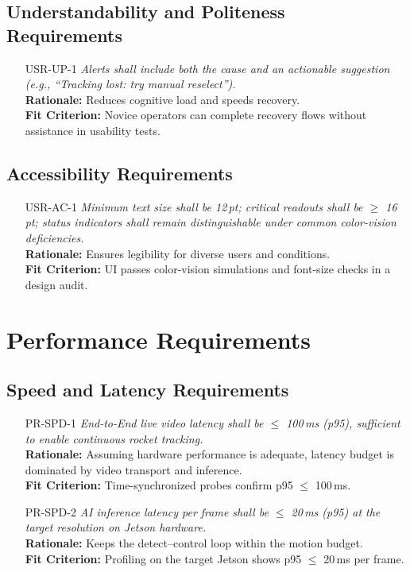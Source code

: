 \documentclass[12pt]{article}
\begin{document}
\subsection{Understandability and Politeness Requirements}
\begin{itemize}[leftmargin=*]
  \item[USR-UP-1] \emph{Alerts shall include both the cause and an actionable
          suggestion (e.g., ``Tracking lost: try manual reselect'').}\\
        \textbf{Rationale:} Reduces cognitive load and speeds recovery.\\ \textbf{Fit
          Criterion:} Novice operators can complete recovery flows without assistance in
        usability tests.
\end{itemize}

\subsection{Accessibility Requirements}
\begin{itemize}[leftmargin=*]
  \item[USR-AC-1] \emph{Minimum text size shall be 12\,pt; critical readouts shall be
          $\geq$ 16\,pt; status indicators shall remain distinguishable under common
          color-vision deficiencies.}\\ \textbf{Rationale:} Ensures legibility for
        diverse users and conditions.\\ \textbf{Fit Criterion:} UI passes color-vision
        simulations and font-size checks in a design audit.
\end{itemize}

\section{Performance Requirements}
\subsection{Speed and Latency Requirements}
\begin{itemize}[leftmargin=*]
  \item[PR-SPD-1] \emph{End-to-End live video latency shall be $\leq$ 100\,ms (p95),
          sufficient to enable continuous rocket tracking.}\\ \textbf{Rationale:}
        Assuming hardware performance is adequate, latency budget is dominated by video
        transport and inference.\\ \textbf{Fit Criterion:} Time-synchronized probes
        confirm p95 $\leq$ 100\,ms.

  \item[PR-SPD-2] \emph{AI inference latency per frame shall be $\leq$ 20\,ms (p95) at
          the target resolution on Jetson hardware.}\\ \textbf{Rationale:} Keeps the
        detect–control loop within the motion budget.\\ \textbf{Fit Criterion:}
        Profiling on the target Jetson shows p95 $\leq$ 20\,ms per frame.
\end{itemize}
\end{document}
